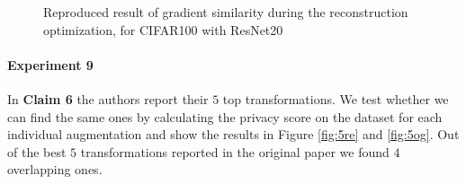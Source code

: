 \begin{figure}[htb]
    \centering
    
    \hspace{5mm}
    \caption{Reproduced result of gradient similarity during the reconstruction optimization, for CIFAR100 with ResNet20}
    \label{fig:6}
    \vspace{-5mm}
\end{figure}

\paragraph{Experiment 9} In \textbf{Claim 6} the authors report their $5$ top transformations. We test whether we can find the same ones by calculating the privacy score on the dataset for each individual augmentation and show the results in Figure \ref{fig:5re} and \ref{fig:5og}. Out of the best $5$ transformations reported in the original paper we found $4$ overlapping ones. 

